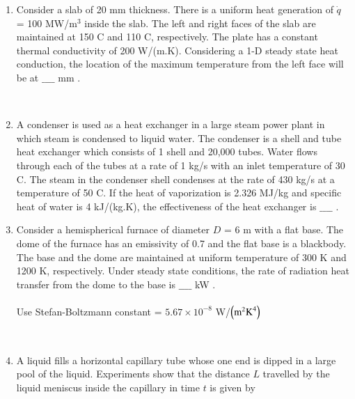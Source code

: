 \documentclass[journal]{IEEEtran}
\begin{document}
\begin{enumerate}
\begin{figure}[!ht]
\centering
\resizebox{0.5\textwidth}{!}{%

}%
\end{figure}\\
\item Consider a slab of 20 mm thickness. There is a uniform heat generation of
$\dot{q}$ = 100 MW/$\text{m}^3$ inside the slab. The left and right faces of the slab are maintained at 150 \degree C and 110 \degree C, respectively. The plate has a constant thermal conductivity of 200 W/(m.K). Considering a 1-D steady state heat conduction, the location of the maximum temperature from the left face will be at $\_\_\_\_$ mm .
\begin{figure}[!ht]
\centering
\resizebox{0.5\textwidth}{!}{%

}%
\end{figure}\\ 
\item A condenser is used as a heat exchanger in a large steam power plant in which steam is condensed to liquid water. The condenser is a shell and tube heat exchanger which consists of 1 shell and 20,000 tubes. Water flows through each of the tubes at a rate of 1 kg/s with an inlet temperature of 30 \degree C. The steam in the condenser shell condenses at the rate of 430 kg/s at a temperature of 50 \degree C. If the heat of vaporization is 2.326 MJ/kg and specific heat of water is 4 kJ/(kg.K), the effectiveness of the heat exchanger is $\_\_\_\_$ . \\
\item Consider a hemispherical furnace of diameter $D$ = 6 m with a flat base. The dome of the furnace has an emissivity of 0.7 and the flat base is a blackbody. The base and the dome are maintained at uniform temperature of 300 K and 1200 K, respectively. Under steady state conditions, the rate of radiation heat transfer from the dome to the base is $\_\_\_\_$ kW . \\\\
Use Stefan-Boltzmann constant = $5.67 \times 10^{-8}$ W/$\left(\text{m}^2\text{K}^4\right)$
\begin{figure}[!ht]
\centering
\resizebox{0.5\textwidth}{!}{%

}%
\end{figure}\\
\item A liquid fills a horizontal capillary tube whose one end is dipped in a large pool of the liquid. Experiments show that the distance $L$ travelled by the liquid meniscus inside the capillary in time $t$ is given by 

\end{enumerate}
\end{document}
